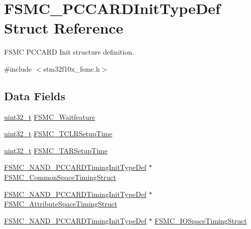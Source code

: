\hypertarget{struct_f_s_m_c___p_c_c_a_r_d_init_type_def}{\section{F\-S\-M\-C\-\_\-\-P\-C\-C\-A\-R\-D\-Init\-Type\-Def Struct Reference}
\label{struct_f_s_m_c___p_c_c_a_r_d_init_type_def}
}


F\-S\-M\-C P\-C\-C\-A\-R\-D Init structure definition.  




{\ttfamily \#include $<$stm32f10x\-\_\-fsmc.\-h$>$}

\subsection*{Data Fields}
\begin{DoxyCompactItemize}
\item 
\hyperlink{stdint_8h_a435d1572bf3f880d55459d9805097f62}{uint32\-\_\-t} \hyperlink{struct_f_s_m_c___p_c_c_a_r_d_init_type_def_a3ffd8c627ffe3ac90dfbfe93a8b97c26}{F\-S\-M\-C\-\_\-\-Waitfeature}
\item 
\hyperlink{stdint_8h_a435d1572bf3f880d55459d9805097f62}{uint32\-\_\-t} \hyperlink{struct_f_s_m_c___p_c_c_a_r_d_init_type_def_a15db9675791f6f9c7fd82fe1084ff694}{F\-S\-M\-C\-\_\-\-T\-C\-L\-R\-Setup\-Time}
\item 
\hyperlink{stdint_8h_a435d1572bf3f880d55459d9805097f62}{uint32\-\_\-t} \hyperlink{struct_f_s_m_c___p_c_c_a_r_d_init_type_def_ac83f977e01623595e0aa8dd0b1eb3fcc}{F\-S\-M\-C\-\_\-\-T\-A\-R\-Setup\-Time}
\item 
\hyperlink{struct_f_s_m_c___n_a_n_d___p_c_c_a_r_d_timing_init_type_def}{F\-S\-M\-C\-\_\-\-N\-A\-N\-D\-\_\-\-P\-C\-C\-A\-R\-D\-Timing\-Init\-Type\-Def} $\ast$ \hyperlink{struct_f_s_m_c___p_c_c_a_r_d_init_type_def_afac8f6c87ad18b6caa550fd73e4b16ea}{F\-S\-M\-C\-\_\-\-Common\-Space\-Timing\-Struct}
\item 
\hyperlink{struct_f_s_m_c___n_a_n_d___p_c_c_a_r_d_timing_init_type_def}{F\-S\-M\-C\-\_\-\-N\-A\-N\-D\-\_\-\-P\-C\-C\-A\-R\-D\-Timing\-Init\-Type\-Def} $\ast$ \hyperlink{struct_f_s_m_c___p_c_c_a_r_d_init_type_def_a304c79f957bd7fc3d83878af92c1c16d}{F\-S\-M\-C\-\_\-\-Attribute\-Space\-Timing\-Struct}
\item 
\hyperlink{struct_f_s_m_c___n_a_n_d___p_c_c_a_r_d_timing_init_type_def}{F\-S\-M\-C\-\_\-\-N\-A\-N\-D\-\_\-\-P\-C\-C\-A\-R\-D\-Timing\-Init\-Type\-Def} $\ast$ \hyperlink{struct_f_s_m_c___p_c_c_a_r_d_init_type_def_a34514ae2564eb2eb0cd46e5bbf05b607}{F\-S\-M\-C\-\_\-\-I\-O\-Space\-Timing\-Struct}
\end{DoxyCompactItemize}


